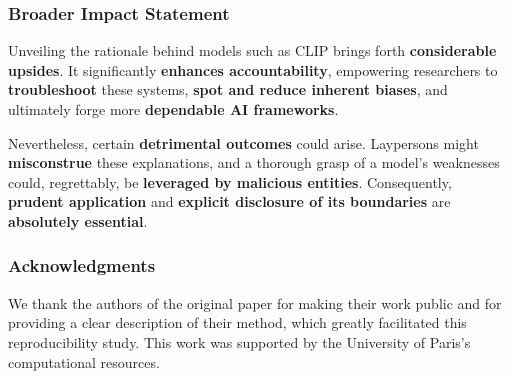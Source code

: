 \documentclass[10pt]{article} %
\begin{document}
\subsubsection*{\textbf{Broader Impact Statement}}
Unveiling the rationale behind models such as CLIP brings forth \textbf{considerable upsides}. It significantly \textbf{enhances accountability}, empowering researchers to \textbf{troubleshoot} these systems, \textbf{spot and reduce inherent biases}, and ultimately forge more \textbf{dependable AI frameworks}.

Nevertheless, certain \textbf{detrimental outcomes} could arise. Laypersons might \textbf{misconstrue} these explanations, and a thorough grasp of a model's weaknesses could, regrettably, be \textbf{leveraged by malicious entities}. Consequently, \textbf{prudent application} and \textbf{explicit disclosure of its boundaries} are \textbf{absolutely essential}.

\subsubsection*{Acknowledgments}
We thank the authors of the original paper for making their work public and for providing a clear description of their method, which greatly facilitated this reproducibility study. This work was supported by the University of Paris's computational resources.



\end{document}
